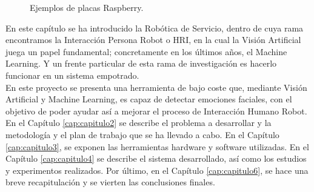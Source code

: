 \begin{figure}[h!]
  \begin{center}
    \subcapcentertrue
    \hspace{1cm}
  \end{center}
\caption{Ejemplos de placas Raspberry.}
\label{fig:raspberry_ejemplos}
\end{figure}

En este capítulo se ha introducido la Robótica de Servicio, dentro de cuya rama encontramos la Interacción Persona Robot o HRI, en la cual la Visión Artificial juega un papel fundamental; concretamente en los últimos años, el Machine Learning. Y un frente particular de esta rama de investigación es hacerlo funcionar en un sistema empotrado.\\

En este proyecto se presenta una herramienta de bajo coste que, mediante Visión Artificial y Machine Learning, es capaz de detectar emociones faciales, con el objetivo de poder ayudar así a mejorar el proceso de Interacción Humano Robot. En el Capítulo \ref{cap:capitulo2} se describe el problema a desarrollar y la metodología y el plan de trabajo que se ha llevado a cabo. En el Capítulo \ref{cap:capitulo3}, se exponen las herramientas hardware y software utilizadas. En el Capítulo \ref{cap:capitulo4} se describe el sistema desarrollado, así como los estudios y experimentos realizados. Por último, en el Capítulo \ref{cap:capitulo6}, se hace una breve recapitulación y se vierten las conclusiones finales.






